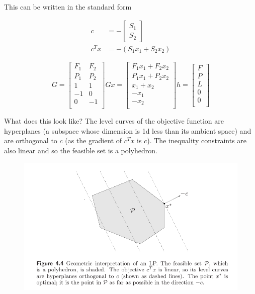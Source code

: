 \documentclass{article}
\begin{document}
\noindent
This can be written in the standard form

\begin{align}
    c     & = -\begin{bmatrix}
        S_1 \\
        S_2
    \end{bmatrix} \\
    c^T x & = -(S_1 x_1 + S_2 x_2)
\end{align}

\begin{equation}
    G =
    \begin{bmatrix}
        F_1 & F_2 \\
        P_1 & P_2 \\
        1   & 1   \\
        -1  & 0   \\
        0   & -1  \\
    \end{bmatrix}
    G x =
    \begin{bmatrix}
        F_1 x_1 + F_2 x_2 \\
        P_1 x_1 + P_2 x_2 \\
        x_1  + x_2        \\
        -x_1              \\
        -x_2              \\
    \end{bmatrix}
    h = \begin{bmatrix}
        F \\
        P \\
        L \\
        0 \\
        0 \\
    \end{bmatrix}
\end{equation}

\noindent
What does this look like? The level curves of the objective function are hyperplanes (a subspace whose dimension is 1d less than its ambient space) and are orthogonal to $c$ (as the gradient of $c^T x$ is $c$).
The inequality constraints are also linear and so the feasible set is a polyhedron.

\begin{figure}[h!]
    \centering
    \includegraphics[width=1\textwidth]{./figures/LinearOptimizationIllustration.png}
\end{figure}
\end{document}
